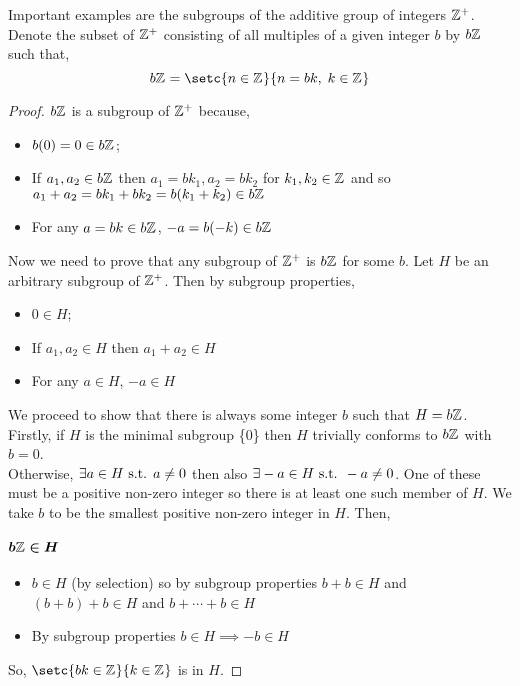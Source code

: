 \documentclass[MathsNotesBase.tex]{subfiles}
\begin{document}
{		Important examples are the subgroups of the additive group of integers $\mathbb{Z}^{+}$. Denote the subset of $\mathbb{Z}^{+}$ consisting of all multiples of a given integer $b$ by $b\mathbb{Z}^{}$ such that,
		\[ b\Z{} = \setc{n \in \Z{}}{n = bk,\; k \in \Z{}} \]
		\begin{proof}
			$b\mathbb{Z}^{}$ is a subgroup of $\mathbb{Z}^{+}$ because,
			\begin{itemize}
				\item{$b(0) = 0 \in b\mathbb{Z}^{}$;}
				\item{If $a_1,a_2 \in b\mathbb{Z}^{}$ then $a_1 = bk_1, a_2 = bk_2$ for $k_1, k_2 \in \mathbb{Z}^{}$ and so $a_1 + a_2 = bk_1 + bk_2 = b(k_1 + k_2) \in b\mathbb{Z}^{}$}
				\item{For any $a = bk \in b\mathbb{Z}^{}$, $-a = b(-k) \in b\mathbb{Z}^{}$}
			\end{itemize}
			Now we need to prove that any subgroup of $\mathbb{Z}^{+}$ is $b\mathbb{Z}^{}$ for some $b$. Let $H$ be an arbitrary subgroup of $\mathbb{Z}^{+}$. Then by subgroup properties,
			\begin{itemize}
				\item{$0 \in H$;}
				\item{If $a_1,a_2 \in H$ then $a_1 + a_2 \in H$}
				\item{For any $a \in H$, $-a \in H$}
			\end{itemize}
			We proceed to show that there is always some integer $b$ such that $H = b\mathbb{Z}^{}$.\\
			Firstly, if $H$ is the minimal subgroup \{0\} then $H$ trivially conforms to $b\mathbb{Z}^{}$ with $b = 0$.\\
			Otherwise, $\exists a \in H \text{ s.t. } a \neq 0$ then also $\exists -a \in H \text{ s.t. } -a \neq 0$. One of these must be a positive non-zero integer so there is at least one such member of $H$. We take $b$ to be the smallest positive non-zero integer in $H$. Then,
			\paragraph{$\bm{b\mathbb{Z}^{} \in H}$}
			\begin{itemize}
				\item{$b \in H$ (by selection) so by subgroup properties $b + b \in H$ and $(b + b) + b \in H$ and $b + \cdots + b \in H$}
				\item{By subgroup properties $b \in H \implies -b \in H$}
			\end{itemize}
			So, $\setc{bk \in \Z{}}{k \in \Z{}}$ is in $H$.

\end{proof}}
\end{document}
